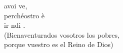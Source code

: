 \begin{cancion}%
	avoi ve,\\
	perchéostro è\\
	ir ndi .\\
(Bienaventurados vosotros los pobres,\\
porque vuestro es el Reino de Dios)\\
\end{cancion}%
